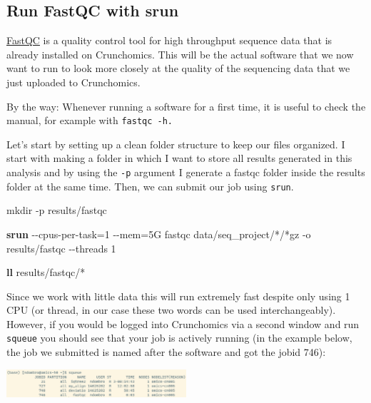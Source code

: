 \documentclass[
  letterpaper,
  DIV=11,
  numbers=noendperiod]{scrreprt}
\newenvironment{Shaded}{}{}
\newcommand{\AttributeTok}[1]{\textcolor[rgb]{0.84,0.23,0.29}{#1}}
\newcommand{\ExtensionTok}[1]{\textcolor[rgb]{0.84,0.23,0.29}{\textbf{#1}}}
\newcommand{\FunctionTok}[1]{\textcolor[rgb]{0.44,0.26,0.76}{#1}}
\newcommand{\NormalTok}[1]{\textcolor[rgb]{0.14,0.16,0.18}{#1}}
\newcommand{\OperatorTok}[1]{\textcolor[rgb]{0.14,0.16,0.18}{#1}}
\newcommand{\PreprocessorTok}[1]{\textcolor[rgb]{0.84,0.23,0.29}{#1}}
\begin{document}
\subsection{Run FastQC with srun}\label{run-fastqc-with-srun}

\href{https://www.bioinformatics.babraham.ac.uk/projects/fastqc/}{FastQC}
is a quality control tool for high throughput sequence data that is
already installed on Crunchomics. This will be the actual software that
we now want to run to look more closely at the quality of the sequencing
data that we just uploaded to Crunchomics.

By the way: Whenever running a software for a first time, it is useful
to check the manual, for example with \texttt{fastqc\ -h.}

Let's start by setting up a clean folder structure to keep our files
organized. I start with making a folder in which I want to store all
results generated in this analysis and by using the \texttt{-p} argument
I generate a fastqc folder inside the results folder at the same time.
Then, we can submit our job using \texttt{srun}.

\begin{Shaded}
\begin{Highlighting}[]
\FunctionTok{mkdir} \AttributeTok{{-}p}\NormalTok{ results/fastqc }

\ExtensionTok{srun} \AttributeTok{{-}{-}cpus{-}per{-}task}\OperatorTok{=}\NormalTok{1 }\AttributeTok{{-}{-}mem}\OperatorTok{=}\NormalTok{5G fastqc data/seq\_project/}\PreprocessorTok{*}\NormalTok{/}\PreprocessorTok{*}\NormalTok{gz }\AttributeTok{{-}o}\NormalTok{ results/fastqc  }\AttributeTok{{-}{-}threads}\NormalTok{ 1}

\ExtensionTok{ll}\NormalTok{ results/fastqc/}\PreprocessorTok{*}
\end{Highlighting}
\end{Shaded}

Since we work with little data this will run extremely fast despite only
using 1 CPU (or thread, in our case these two words can be used
interchangeably). However, if you would be logged into Crunchomics via a
second window and run \texttt{squeue} you should see that your job is
actively running (in the example below, the job we submitted is named
after the software and got the jobid 746):

\begin{center}
\includegraphics[width=0.5\textwidth,height=\textheight]{../img/squeue2.png}
\end{center}
\end{document}
